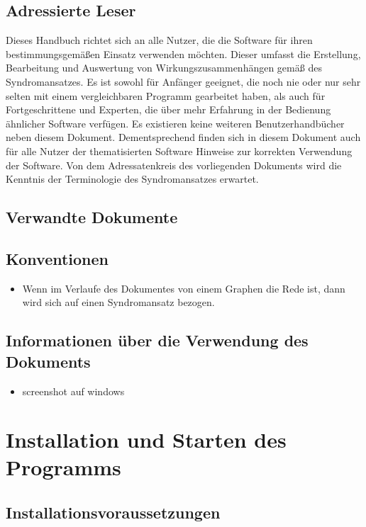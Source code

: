 \documentclass[enabledeprecatedfontcommands,fontsize=11pt,paper=a4,twoside]{scrartcl}
\newcounter{one}
\begin{document}
	\subsection{Adressierte Leser}
	Dieses Handbuch richtet sich an alle Nutzer, die die Software für ihren bestimmungsgemäßen Einsatz verwenden möchten. Dieser umfasst die Erstellung, Bearbeitung und Auswertung von Wirkungszusammenhängen gemäß des Syndromansatzes. Es ist sowohl für Anfänger geeignet, die noch nie oder nur sehr selten mit einem vergleichbaren Programm gearbeitet haben, als auch für Fortgeschrittene und Experten, die über mehr Erfahrung in der Bedienung ähnlicher Software verfügen. Es existieren keine weiteren Benutzerhandbücher neben diesem Dokument. Dementsprechend finden sich in diesem Dokument auch für alle Nutzer der thematisierten Software Hinweise zur korrekten Verwendung der Software. Von dem Adressatenkreis des vorliegenden Dokuments wird die Kenntnis der Terminologie des Syndromansatzes erwartet.  
	\subsection{Verwandte Dokumente}
	\subsection{Konventionen}
		\begin{itemize}
			\item Wenn im Verlaufe des Dokumentes von einem Graphen die Rede ist, dann wird sich auf einen Syndromansatz bezogen.
		\end{itemize}
	\subsection{Informationen über die Verwendung des Dokuments}

\begin{itemize}
	\item screenshot auf windows	
\end{itemize}


\newpage
\section{Installation und Starten des Programms} \label{sec:installation}

	\subsection{Installationsvoraussetzungen}
\end{document}
